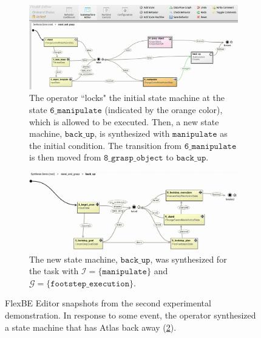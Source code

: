 \begin{figure}[t]
	\centering
	\begin{subfigure}[b]{0.99\columnwidth}
	\includegraphics[width=0.99\columnwidth, clip]{./img/synthesis_runtime_connect_sm.png}
	\caption{The operator ``locks" the initial state machine at the state $\mathtt{6\_manipulate}$ (indicated by the orange color), which is allowed to be executed.
	Then, a new state machine, $\mathtt{back\_up}$, is synthesized with $\mathtt{manipulate}$ as the initial condition.
	The transition from $\mathtt{6\_manipulate}$ is then moved from $\mathtt{8\_grasp\_object}$ to $\mathtt{back\_up}$.
	} 
	\label{Fig:runtime1}
	\end{subfigure}
	
	\vspace{4 pt}
	\begin{subfigure}[b]{0.99\columnwidth}
	\includegraphics[width=0.99\columnwidth, clip]{./img/synthesis_runtime_synthesized_sm.png}
	\caption{The new state machine, $\mathtt{back\_up}$, was synthesized for the task with $\mathcal{I} = \{ \mathtt{manipulate} \}$ and $\mathcal{G} = \{ \mathtt{footstep\_execution} \}$.
	} 
	\label{Fig:runtime2}
	\end{subfigure}
	\caption{
	FlexBE Editor snapshots from the second experimental demonstration.
	In response to some event, the operator synthesized a state machine that has Atlas back away (\ref{Fig:runtime2}).
	}
	\label{Fig:synthesis_runtime_demo}
	\vspace{-10 pt}
\end{figure}

